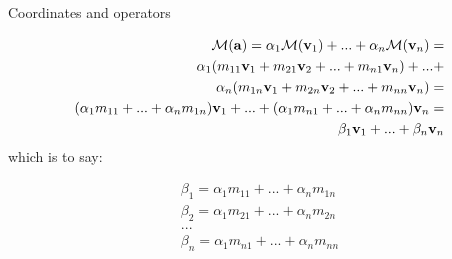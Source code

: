 \documentclass{beamer}
\begin{document}
\begin{frame}{Coordinates and operators}
	\begin{flushleft}
		
		\begin{align*}
			\mathcal{M}(\mathbf{a}) = 
			\alpha_1 \mathcal{M}(\mathbf{v}_1) + ... + \alpha_n \mathcal{M}(\mathbf{v}_n) 
			= \\
			\alpha_1 (m_{11} \mathbf{v}_1 + m_{21}  \mathbf{v}_2 + ... + m_{n1} \mathbf{v}_n) 
			+ ... + \\
			\alpha_n (m_{1n} \mathbf{v}_1 + m_{2n}  \mathbf{v}_2 + ... + m_{nn} \mathbf{v}_n)
			= \\
			(\alpha_1 m_{11} + ... + \alpha_n m_{1n}) \mathbf{v}_1 
			+ ... + 
			(\alpha_1 m_{n1} + ... + \alpha_n m_{nn}) \mathbf{v}_n 
			= \\
			 \beta_1 \mathbf{v}_1 + ... + \beta_n \mathbf{v}_n
		\end{align*}		
%
which is to say:

		\begin{align*}
	\beta_1 = \alpha_1 m_{11} + ... + \alpha_n m_{1n} \\
	\beta_2 = \alpha_1 m_{21} + ... + \alpha_n m_{2n} \\
	... \\
	\beta_n = \alpha_1 m_{n1} + ... + \alpha_n m_{nn}
		\end{align*}		

		
		
	\end{flushleft}
\end{frame}
\end{document}
